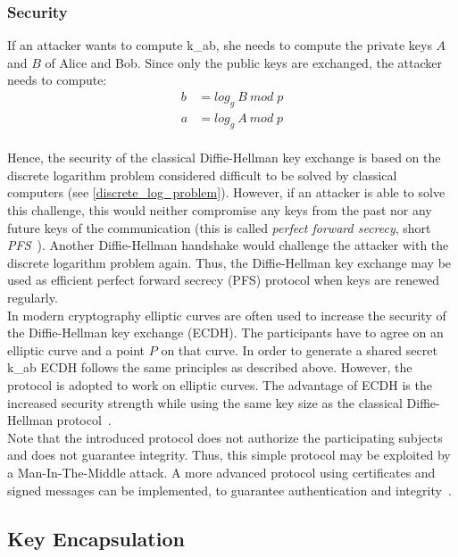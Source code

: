 \subsubsection{Security}
If an attacker wants to compute \gls{k_ab}, she needs to compute the private keys $A$ and $B$ of Alice and Bob. Since only the public keys are exchanged, the attacker needs to compute:
\begin{equation*}
\begin{split}
b &= log_g\:B\:mod\;p\\ 
a &= log_g\:A\:mod\;p
\end{split}
\end{equation*}
\\
Hence, the security of the classical Diffie-Hellman key exchange is based on the discrete logarithm problem considered difficult to be solved by classical computers (see \autoref{discrete_log_problem}). However, if an attacker is able to solve this challenge, this would neither compromise any keys from the past nor any future keys of the communication (this is called \textit{perfect forward secrecy}, short \textit{\gls{PFS}}~\parencite{ITSicherheit}). Another Diffie-Hellman handshake would challenge the attacker with the discrete logarithm problem again. Thus, the Diffie-Hellman key exchange may be used as efficient perfect forward secrecy (\gls{PFS}) protocol when keys are renewed regularly.\\
In modern cryptography elliptic curves are often used to increase the security of the Diffie-Hellman key exchange (\gls{ECDH}). The participants have to agree on an elliptic curve and a point $P$ on that curve. In order to generate a shared secret \gls{k_ab} \gls{ECDH} follows the same principles as described above. However, the protocol is adopted to work on elliptic curves. The advantage of \gls{ECDH} is the increased security strength while using the same key size as the classical Diffie-Hellman protocol~\parencite{ITSicherheit}.
\\
Note that the introduced protocol does not authorize the participating subjects and does not guarantee integrity. Thus, this simple protocol may be exploited by a Man-In-The-Middle attack. A more advanced protocol using certificates and signed messages can be implemented, to guarantee authentication and integrity~\parencite{ITSicherheit}.

\subsection{Key Encapsulation}

